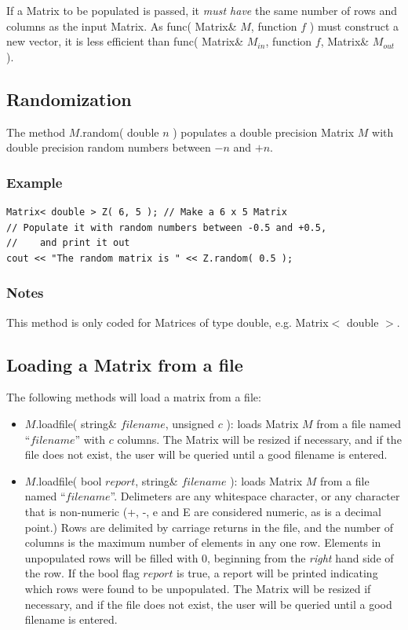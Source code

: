 \documentclass{report}
\begin{document}
If a Matrix to be populated is passed, it {\em must have} the same
number of rows and columns as the input Matrix.  As func( Matrix\&
$M$, function $f$ ) must construct a new vector, it is less efficient
than func( Matrix\& $M_{in}$, function $f$, Matrix\& $M_{out}$ ).

\subsection{Randomization}

The method $M$.random( double $n$ ) populates a double precision
Matrix $M$ with double precision random numbers between $-n$ and $+n$.

\subsubsection{Example}

\begin{verbatim}
Matrix< double > Z( 6, 5 ); // Make a 6 x 5 Matrix
// Populate it with random numbers between -0.5 and +0.5,
//    and print it out
cout << "The random matrix is " << Z.random( 0.5 );
\end{verbatim}

\subsubsection{Notes}
This method is only coded for Matrices of type double, e.g. Matrix$<$
double $>$.

\subsection{Loading a Matrix from a file}

The following methods will load a matrix from a file:
\begin{itemize}
\item $M$.loadfile( string\& $filename$, unsigned $c$ ): loads Matrix
      $M$ from a file named ``$filename$'' with $c$ columns.  The
      Matrix will be resized if necessary, and if the file does not
      exist, the user will be queried until a good filename is
      entered.
\item $M$.loadfile( bool $report$, string\& $filename$ ): loads Matrix
      $M$ from a file named ``$filename$''. Delimeters are any
      whitespace character, or any character that is non-numeric (+,
      -, e and E are considered numeric, as is a decimal point.)  Rows
      are delimited by carriage returns in the file, and the number of
      columns is the maximum number of elements in any one row.
      Elements in unpopulated rows will be filled with 0, beginning
      from the {\em right} hand side of the row.  If the bool flag
      $report$ is true, a report will be printed indicating which rows
      were found to be unpopulated.  The Matrix will be resized if
      necessary, and if the file does not exist, the user will be
      queried until a good filename is entered.
\end{itemize}
\end{document}
